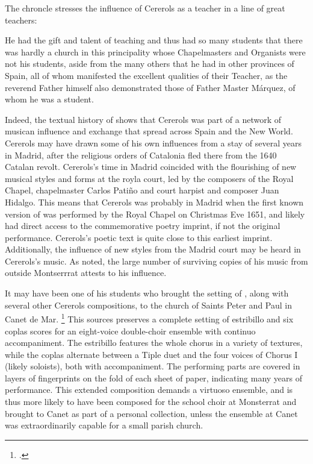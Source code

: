 The chroncle stresses the influence of Cererols as a teacher in a line of great
teachers:
\begin{quoting}
    He had the gift and talent of teaching and thus had so many students that
    there was hardly a church in this principality  whose
    Chapelmasters and Organists were not his students, aside from the many
    others that he had in other provinces of Spain, all of whom manifested the
    excellent qualities of their Teacher, as the reverend Father himself also
    demonstrated those of Father Master Márquez, of whom he  was a
    student.
\end{quoting}
Indeed, the textual history of  shows that Cererols
was part of a network of musican influence and exchange that spread across Spain
and the New World. 
Cererols may have drawn some of his own influences from a stay of several years
in Madrid, after the religious orders of Catalonia fled there from the 1640
Catalan revolt.
Cererols's time in Madrid coincided with the flourishing of new musical styles
and forms at the royla court, led by the composers of the Royal Chapel,
chapelmaster Carlos Patiño and court harpist and composer Juan Hidalgo.
This means that Cererols was probably in Madrid when the first known version of
 was performed by the Royal Chapel on Christmas Eve
1651, and likely had direct access to the commemorative poetry imprint, if not
the original performance.
Cererols's poetic text is quite close to this earliest imprint.
Additionally, the influence of new styles from the Madrid court may be heard in
Cererols's music.
As noted, the large number of surviving copies of his music from outside
Montserrrat attests to his influence.

It may have been one of his students who brought the setting of
, along with several other Cererols compositions, to
the church of Saints Peter and Paul in Canet de Mar.%
    \footnote{.}
This sources preserves a complete setting of estribillo and six coplas scores
for an eight-voice double-choir ensemble with continuo accompaniment.
The estribillo features the whole chorus in a variety of textures, while the
coplas alternate between a Tiple duet and the four voices of Chorus I (likely
soloists), both with accompaniment.
The performing parts are covered in layers of fingerprints on the fold of each
sheet of paper, indicating many years of performance.
This extended composition demands a virtuoso ensemble, and is thus more likely
to have been composed for the school choir at Monsterrat and brought to Canet as
part of a personal collection, unless the ensemble at Canet was extraordinarily
capable for a small parish church.

